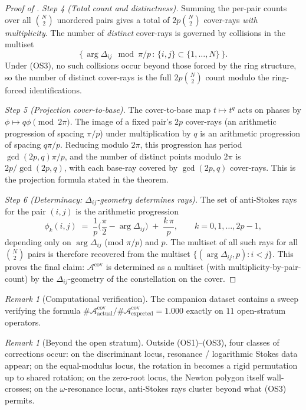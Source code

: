 \documentclass[aip,jmp,preprint,amsmath,amssymb,nofootinbib,floatfix]{revtex4-2}
\theoremstyle{plain}
\theoremstyle{definition}
\theoremstyle{remark}
\newtheorem{remark}[theorem]{Remark}
\newcommand{\Acov}{\mathcal{A}^{\mathrm{cov}}}
\newcommand{\Dij}{\Delta_{ij}}
\DeclareMathOperator{\arginline}{arg}
\begin{document}
\begin{proof}[Proof of ]
\smallskip
\textit{Step 4 (Total count and distinctness).}
Summing the per-pair counts over all $\binom{N}{2}$ unordered pairs
gives a total of $2p \binom{N}{2}$ cover-rays \emph{with
multiplicity}. The number of \emph{distinct} cover-rays is governed
by collisions in the multiset
\[
   \big\{\,\arginline \Dij \mod \pi/p \,:\, \{i, j\} \subset
   \{1, \dots, N\}\,\big\}.
\]
Under (OS3), no such collisions occur beyond those forced by the
ring structure, so the number of distinct cover-rays is the full
$2p \binom{N}{2}$ count modulo the ring-forced identifications.

\smallskip
\textit{Step 5 (Projection cover-to-base).}
The cover-to-base map $t \mapsto t^q$ acts on phases by $\phi \mapsto
q\phi \pmod{2\pi}$. The image of a fixed pair's $2p$ cover-rays (an
arithmetic progression of spacing $\pi/p$) under multiplication by
$q$ is an arithmetic progression of spacing $q \pi / p$. Reducing
modulo $2\pi$, this progression has period $\gcd(2p, q) \pi / p$, and
the number of distinct points modulo $2\pi$ is
$2p / \gcd(2p, q)$, with each base-ray covered by $\gcd(2p, q)$
cover-rays. This is the projection formula stated in the theorem.

\smallskip
\textit{Step 6 (Determinacy: $\Dij$-geometry determines rays).}
The set of anti-Stokes rays for the pair $(i, j)$ is the arithmetic
progression
\[
   \phi_k(i, j) \;=\; \frac{1}{p}\Big(\frac{\pi}{2} - \arginline \Dij
   \Big) \;+\; \frac{k\, \pi}{p}, \qquad k = 0, 1, \dots, 2p - 1,
\]
depending only on $\arginline \Dij$ (mod $\pi/p$) and $p$. The
multiset of all such rays for all $\binom{N}{2}$ pairs is therefore
recovered from the multiset $\{(\arginline \Dij, p) : i < j\}$. This
proves the final claim: $\Acov$ is determined as a multiset (with
multiplicity-by-pair-count) by the $\Dij$-geometry of the
constellation on the cover.
\end{proof}

\begin{remark}[Computational verification]\label{rem:AT1-verif}
The companion dataset \cite{wkb_dataset_v1} contains a sweep verifying
the formula $\#\Acov_{\mathrm{actual}} / \#\Acov_{\mathrm{expected}}
= 1.000$ exactly on $11$ open-stratum operators.
\end{remark}

\begin{remark}[Beyond the open stratum]\label{rem:AT1-degenerate}
Outside (OS1)--(OS3), four classes of corrections occur:
on the discriminant locus, resonance / logarithmic Stokes data appear;
on the equal-modulus locus, the rotation in  becomes a
rigid permutation up to shared rotation; on the zero-root locus, the
Newton polygon itself wall-crosses; on the $\omega$-resonance locus,
anti-Stokes rays cluster beyond what (OS3) permits.
\end{remark}
\end{document}
